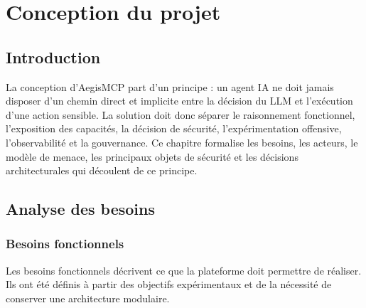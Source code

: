 \chapter{Conception du projet}

\section*{Introduction}

La conception d'AegisMCP part d'un principe : un agent IA ne doit jamais disposer d'un chemin direct et implicite entre la décision du LLM et l'exécution d'une action sensible. La solution doit donc séparer le raisonnement fonctionnel, l'exposition des capacités, la décision de sécurité, l'expérimentation offensive, l'observabilité et la gouvernance. Ce chapitre formalise les besoins, les acteurs, le modèle de menace, les principaux objets de sécurité et les décisions architecturales qui découlent de ce principe.

\section{Analyse des besoins}

\subsection{Besoins fonctionnels}

Les besoins fonctionnels décrivent ce que la plateforme doit permettre de réaliser. Ils ont été définis à partir des objectifs expérimentaux et de la nécessité de conserver une architecture modulaire.

